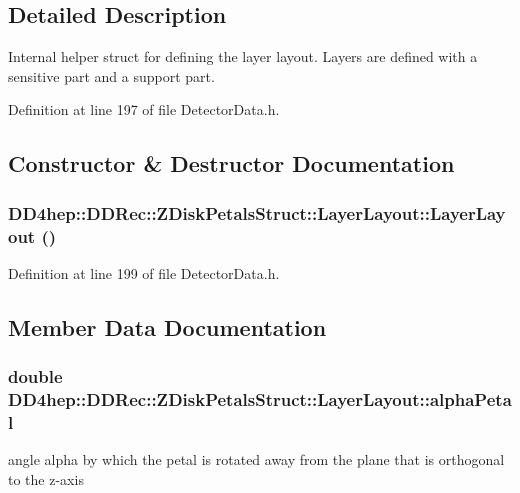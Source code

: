 \subsection{Detailed Description}
Internal helper struct for defining the layer layout. Layers are defined with a sensitive part and a support part. 

Definition at line 197 of file DetectorData.h.

\subsection{Constructor \& Destructor Documentation}
\hypertarget{struct_d_d4hep_1_1_d_d_rec_1_1_z_disk_petals_struct_1_1_layer_layout_ae927543c3f4f96d195e45e75db37b9b8}{
\subsubsection[{LayerLayout}]{\setlength{\rightskip}{0pt plus 5cm}DD4hep::DDRec::ZDiskPetalsStruct::LayerLayout::LayerLayout ()}}
\label{struct_d_d4hep_1_1_d_d_rec_1_1_z_disk_petals_struct_1_1_layer_layout_ae927543c3f4f96d195e45e75db37b9b8}


Definition at line 199 of file DetectorData.h.

\subsection{Member Data Documentation}
\hypertarget{struct_d_d4hep_1_1_d_d_rec_1_1_z_disk_petals_struct_1_1_layer_layout_a8e5089dc9e7157730d3c3773ed6f285c}{
\subsubsection[{alphaPetal}]{\setlength{\rightskip}{0pt plus 5cm}double {\bf DD4hep::DDRec::ZDiskPetalsStruct::LayerLayout::alphaPetal}}}
\label{struct_d_d4hep_1_1_d_d_rec_1_1_z_disk_petals_struct_1_1_layer_layout_a8e5089dc9e7157730d3c3773ed6f285c}
angle alpha by which the petal is rotated away from the plane that is orthogonal to the z-\/axis 

